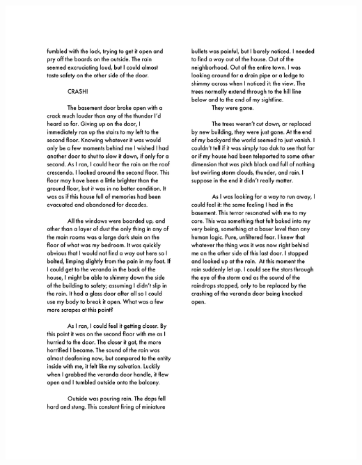 \begin{center}
     \includegraphics[scale=0.75]{Scores/Raindrops Text_Part4.pdf}
\end{center}
\newpage





\backmatter


